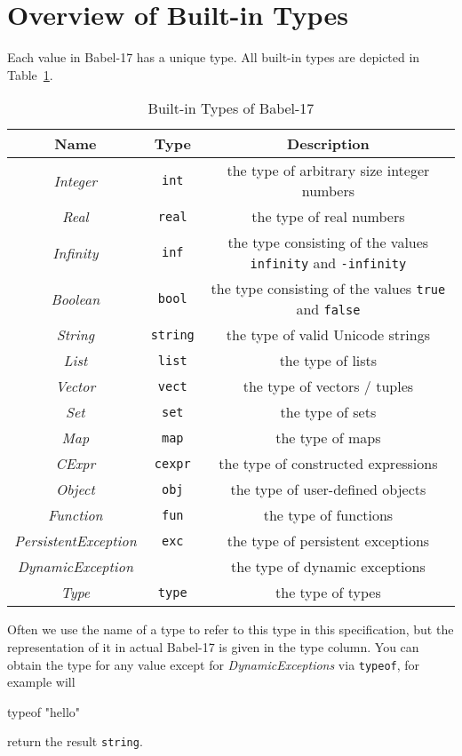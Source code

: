 \documentclass[11pt]{amsart}
\newcommand{\metababel}[1] {\textsl{#1}}
\newcommand{\babelsrc}[1] {\lstinline!#1!}
\begin{document}
\section{Overview of Built-in Types}
Each value in Babel-17 has a unique type. All built-in types are depicted in Table~\ref{table:builtintypes}.
\begin{table}
\caption{Built-in Types of Babel-17}
\begin{tabular}{c|c|c}
\textbf{Name} & \textbf{Type} & \textbf{Description}\\\hline
\metababel {Integer} & \verb+int+ & the type of arbitrary size integer numbers\\
\metababel {Real} & \verb+real+ & the type of real numbers\\
\metababel{Infinity} &\verb+inf+ & the type consisting of the values \babelsrc{infinity} and \babelsrc{-infinity}\\
\metababel{Boolean} & \verb+bool+ &  the type consisting of the values \babelsrc{true} and \babelsrc{false}\\
\metababel{String} & \verb+string+ &  the type of valid Unicode strings\\
\metababel{List} & \verb+list+&  the type of lists\\
\metababel{Vector} & \verb+vect+ &  the type of vectors / tuples\\
\metababel{Set} & \verb+set+ &  the type of sets \\
\metababel{Map}& \verb+map+ &  the type of maps \\
\metababel{CExpr} & \verb+cexpr+ &  the type of constructed expressions\\
\metababel{Object} & \verb+obj+ &  the type of user-defined objects\\
\metababel{Function} & \verb+fun+ &  the type of  functions\\
\metababel{PersistentException} & \verb+exc+ &  the type of persistent exceptions\\
\metababel{DynamicException} & &  the type of dynamic exceptions\\
\metababel{Type} &  \verb+type+ &  the type of types\\
\end{tabular}
\label{table:builtintypes}
\end{table}
Often we use the name of a type to refer to this type in this specification, but the representation of it in actual Babel-17 is given in the type column. You can obtain the type for any value except for \metababel{DynamicExceptions} via \babelsrc{typeof}, for example will
\begin{babellisting}
typeof "hello"
\end{babellisting}
return the result \verb+string+.
\end{document}
